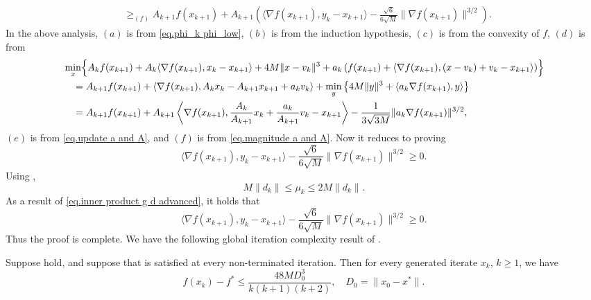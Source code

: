 \documentclass[moor,sglanonrev]{informs4}
\begin{document}
{\begin{align*}
             & \geq_{(f)} A_{k+1} f(x_{k+1}) + A_{k+1} \left(
            \langle \nabla f(x_{k+1}), y_k - x_{k+1} \rangle
            - \frac{\sqrt{6}}{6\sqrt{M}} \|\nabla f(x_{k+1})\|^{3/2} \right).
        \end{align*}
        In the above analysis, $(a)$ is from \eqref{eq.phi_k phi_low}, $(b)$ is from the induction hypothesis, $(c)$ is from the convexity of $f$, $(d)$ is from
        \begin{equation*}
            \begin{aligned}
                 & \min_{x} \Bigl\{ A_k f(x_{k+1}) + A_k \langle \nabla f(x_{k+1}), x_k - x_{k+1} \rangle + 4M \|x - v_k\|^3 + a_k \left(f(x_{k+1}) + \langle \nabla f(x_{k+1}), (x - v_k) + v_k - x_{k+1} \rangle \right) \Bigr\} \\
                 & \quad = A_{k+1} f(x_{k+1}) + \left\langle \nabla f(x_{k+1}), A_k x_k - A_{k+1} x_{k+1} + a_k v_k \right\rangle + \min_{y} \left\{ 4M \|y\|^3 + \langle a_k \nabla f(x_{k+1}), y \rangle \right\}                \\
                 & \quad = A_{k+1} f(x_{k+1}) + A_{k+1} \left\langle \nabla f(x_{k+1}), \frac{A_k}{A_{k+1}} x_k + \frac{a_k}{A_{k+1}} v_k - x_{k+1} \right\rangle - \frac{1}{3\sqrt{3M}} \|a_k \nabla f(x_{k+1})\|^{3/2},
            \end{aligned}
        \end{equation*}
        $(e)$ is from \eqref{eq.update a and A}, and $(f)$ is from \eqref{eq.magnitude a and A}.} Now it reduces to proving
\begin{equation*}
    \langle \nabla f(x_{k+1}),y_k-x_{k+1} \rangle -\frac{\sqrt{6}}{6\sqrt{M}}\|\nabla f(x_{k+1})\|^{3/2} \geq 0.
\end{equation*}
{\color{red}Using ,}
\begin{equation*}
    M\|d_k\| \leq \mu_k \leq 2M\|d_k\|.
\end{equation*}
As a result of \eqref{eq.inner product g d advanced}, it holds that
\begin{equation*}
    \langle \nabla f(x_{k+1}),y_k-x_{k+1} \rangle -\frac{\sqrt{6}}{6\sqrt{M}}\|\nabla f(x_{k+1})\|^{3/2} \geq 0.
\end{equation*}
Thus the proof is complete.
\Halmos \endproof
We have the following global iteration complexity result of .
{\color{red}
\begin{theorem}
    \label{thm.convergence outer loop}
    Suppose 
    hold, and suppose that  is satisfied at every non-terminated
    iteration. Then for every generated iterate $x_k$, $k\geq 1$, we have
    \[
        f(x_k)-f^*
        \leq
        \frac{48MD_0^3}{k(k+1)(k+2)}, \quad D_0 = \|x_0-x^*\|.
    \]
\end{theorem}
}
\end{document}
